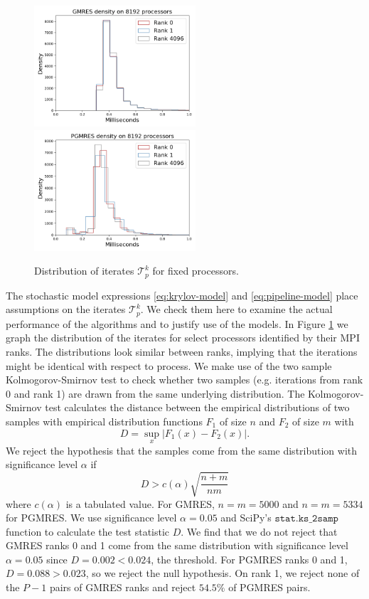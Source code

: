 \documentclass[sigconf]{acmart}
\begin{document}
\begin{figure}[t]
\centering
\includegraphics[width=6cm]{../plots/GMRES_ex23_8192_1000000_identical_in_p.png}
\includegraphics[width=6cm]{../plots/PGMRES_ex23_8192_1000000_identical_in_p.png}
\caption{Distribution of iterates $\mathcal{T}^k_p$ for fixed processors.} \label{fig:ex23-identical}
\end{figure}



The stochastic model expressions \eqref{eq:krylov-model} and \eqref{eq:pipeline-model} place assumptions on the iterates $\mathcal{T}^k_p$. We check them here to examine the actual performance of the algorithms and to justify use of the models. 
In Figure \ref{fig:ex23-identical} we graph the distribution of the iterates for select processors identified by their MPI ranks. The distributions look similar between ranks, implying that the iterations might be identical with respect to process. We make use of the two sample Kolmogorov-Smirnov test to check whether two samples (e.g. iterations from rank 0 and rank 1) are drawn from the same underlying distribution. The Kolmogorov-Smirnov test calculates the distance between the empirical distributions of two samples with empirical distribution functions $F_1$ of size $n$ and $F_2$ of size $m$ with
$$ D = \sup_x |F_1(x) - F_2(x)|. $$
We reject the hypothesis that the samples come from the same distribution with significance level $\alpha$ if 
$$D > c(\alpha)\sqrt{\frac{n + m}{nm}}$$
where $c(\alpha)$ is a tabulated value. 
For GMRES, $n = m = 5000$ and $n = m = 5334$ for PGMRES. We use significance level $\alpha = 0.05$ and SciPy's ${\texttt{stat.ks\_2samp}}$ function to calculate the test statistic $D$.  
We find that we do not reject that GMRES ranks 0 and 1 come from the same distribution with significance level $\alpha = 0.05$ since $D = 0.002 < 0.024$, the threshold. For PGMRES ranks 0 and 1, $D = 0.088 > 0.023$, so we reject the null hypothesis. 
On rank 1, we reject none of the $P-1$ pairs of GMRES ranks and reject $54.5\%$ of PGMRES pairs.
\end{document}
